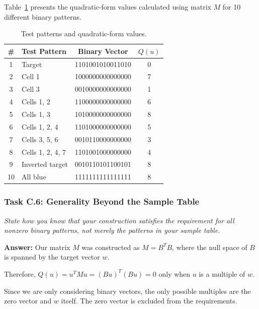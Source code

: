 \documentclass[11pt]{article}
\begin{document}
Table~\ref{tab:sample_patterns} presents the quadratic-form values calculated using matrix $M$ for 10 different binary patterns.


\begin{table}[H]
\centering
\scriptsize
\begin{tabular}{clcc}
\toprule
\# & Test Pattern & Binary Vector & $Q(u)$ \\
\midrule
1 & Target & 1101001010011010 & 0 \\
2 & Cell 1 & 1000000000000000 & 7 \\
3 & Cell 3 & 0010000000000000 & 1 \\
4 & Cells 1, 2 & 1100000000000000 & 6 \\
5 & Cells 1, 3 & 1010000000000000 & 8 \\
6 & Cells 1, 2, 4 & 1101000000000000 & 5 \\
7 & Cells 3, 5, 6 & 0010110000000000 & 3 \\
8 & Cells 1, 2, 4, 7 & 1101001000000000 & 4 \\
9 & Inverted target & 0010110101100101 & 8 \\
10 & All blue & 1111111111111111 & 8 \\
\bottomrule
\end{tabular}
\caption{Test patterns and quadratic-form values.}
\label{tab:sample_patterns}
\end{table}

\vspace{0.5em}

\subsubsection*{Task C.6: Generality Beyond the Sample Table}
\textit{State how you know that your construction satisfies the requirement for all nonzero binary patterns, not merely the patterns in your sample table.}

\vspace{0.4em}
\textbf{Answer:} 
Our matrix $M$ was constructed as $M = B^TB$, where the null space of $B$ is spanned by the target vector $w$.

Therefore, $Q(u) = u^TMu = (Bu)^T(Bu) = 0$ only when $u$ is a multiple of $w$.

Since we are only considering binary vectors, the only possible multiples are the zero vector and $w$ itself. The zero vector is excluded from the requirements.
\end{document}
